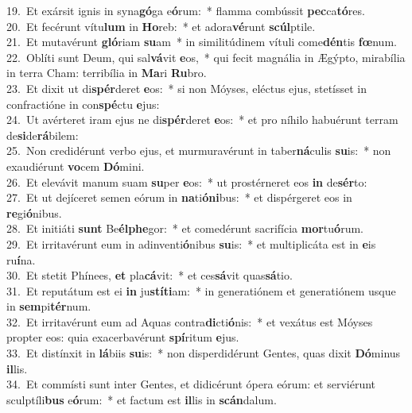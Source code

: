 {19.~}Et exársit ignis in syna\textbf{gó}ga e\textbf{ó}rum:~* flamma combússit \textbf{pec}ca\textbf{tó}res.\\
{20.~}Et fecérunt vítu\textbf{lum} in \textbf{Ho}reb:~* et adora\textbf{vé}runt \textbf{scúl}ptile.\\
{21.~}Et mutavérunt \textbf{gló}riam \textbf{su}am~* in similitúdinem vítuli come\textbf{dén}tis \textbf{fœ}num.\\
{22.~}Oblíti sunt Deum, qui sal\textbf{vá}vit \textbf{e}os,~* qui fecit magnália in Ægýpto, mirabília in terra Cham: terribília in \textbf{Ma}ri \textbf{Ru}bro.\\
{23.~}Et dixit ut di\textbf{spér}deret \textbf{e}os:~* si non Móyses, eléctus ejus, stetísset in confractióne in con\textbf{spé}ctu \textbf{e}jus:\\
{24.~}Ut avérteret iram ejus ne di\textbf{spér}deret \textbf{e}os:~* et pro níhilo habuérunt terram de\textbf{si}de\textbf{rá}bilem:\\
{25.~}Non credidérunt verbo ejus, et murmuravérunt in taber\textbf{ná}culis \textbf{su}is:~* non exaudiérunt \textbf{vo}cem \textbf{Dó}mini.\\
{26.~}Et elevávit manum suam \textbf{su}per \textbf{e}os:~* ut prostérneret eos \textbf{in} de\textbf{sér}to:\\
{27.~}Et ut dejíceret semen eórum in \textbf{na}ti\textbf{ó}\textbf{ni}bus:~* et dispérgeret eos in \textbf{re}gi\textbf{ó}nibus.\\
{28.~}Et initiáti \textbf{sunt} Be\textbf{él}\textbf{phe}gor:~* et comedérunt sacrifícia \textbf{mor}tu\textbf{ó}rum.\\
{29.~}Et irritavérunt eum in adinventi\textbf{ó}nibus \textbf{su}is:~* et multiplicáta est in \textbf{e}is ru\textbf{í}na.\\
{30.~}Et stetit Phínees, \textbf{et} pla\textbf{cá}vit:~* et ces\textbf{sá}vit quas\textbf{sá}tio.\\
{31.~}Et reputátum est ei \textbf{in} ju\textbf{stí}\textbf{ti}am:~* in generatiónem et generatiónem usque in \textbf{sem}pi\textbf{tér}num.\\
{32.~}Et irritavérunt eum ad Aquas contra\textbf{di}cti\textbf{ó}nis:~* et vexátus est Móyses propter eos: quia exacerbavérunt \textbf{spí}ritum \textbf{e}jus.\\
{33.~}Et distínxit in \textbf{lá}biis \textbf{su}is:~* non disperdidérunt Gentes, quas dixit \textbf{Dó}minus \textbf{il}lis.\\
{34.~}Et commísti sunt inter Gentes, et didicérunt ópera eórum: et serviérunt sculptíli\textbf{bus} e\textbf{ó}rum:~* et factum est \textbf{il}lis in \textbf{scán}dalum.\\
